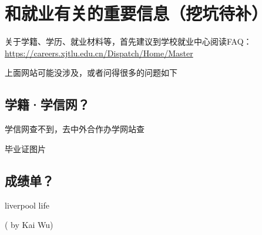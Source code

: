 \section{和就业有关的重要信息（挖坑待补）}

关于学籍、学历、就业材料等，首先建议到学校就业中心阅读FAQ：\url{https://careers.xjtlu.edu.cn/Dispatch/Home/Master}

上面网站可能没涉及，或者问得很多的问题如下

\subsection{学籍·学信网？}

学信网查不到，去中外合作办学网站查

毕业证图片

\subsection{成绩单？}

liverpool life



\begin{flushright}
( by Kai Wu)
\end{flushright}





% 
